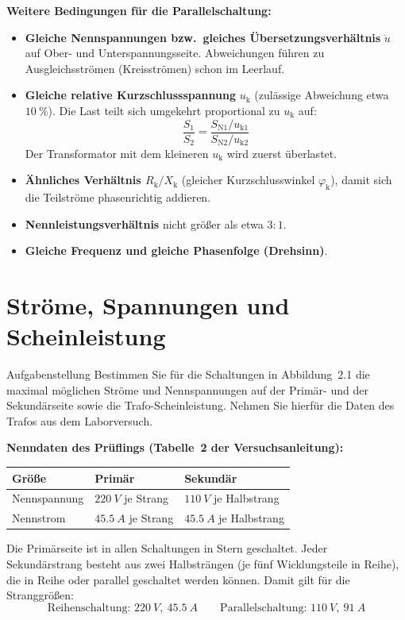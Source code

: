 \documentclass[a4paper,11pt]{scrreprt}
\newcommand{\ue}{\ddot{u}}
\begin{document}
\textbf{Weitere Bedingungen für die Parallelschaltung:}
\begin{itemize}[nosep]
  \item \textbf{Gleiche Nennspannungen bzw.\ gleiches Übersetzungsverhältnis} $\ue$ auf Ober- und Unterspannungsseite. Abweichungen führen zu Ausgleichsströmen (Kreisströmen) schon im Leerlauf.
  \item \textbf{Gleiche relative Kurzschlussspannung} $u_\mathrm{k}$ (zulässige Abweichung etwa $\SI{10}{\percent}$). Die Last teilt sich umgekehrt proportional zu $u_\mathrm{k}$ auf:
  \begin{equation*}
    \frac{S_1}{S_2} = \frac{S_\mathrm{N1}/u_\mathrm{k1}}{S_\mathrm{N2}/u_\mathrm{k2}}
  \end{equation*}
  Der Transformator mit dem kleineren $u_\mathrm{k}$ wird zuerst überlastet.
  \item \textbf{Ähnliches Verhältnis $R_\mathrm{k}/X_\mathrm{k}$} (gleicher Kurzschlusswinkel $\varphi_\mathrm{k}$), damit sich die Teilströme phasenrichtig addieren.
  \item \textbf{Nennleistungsverhältnis} nicht größer als etwa $3:1$.
  \item \textbf{Gleiche Frequenz und gleiche Phasenfolge (Drehsinn)}.
\end{itemize}

\section{Ströme, Spannungen und Scheinleistung}\label{sec:a2}

\begin{aufgabe}{Aufgabenstellung}
Bestimmen Sie für die Schaltungen in Abbildung~2.1 die maximal möglichen Ströme und Nennspannungen auf der Primär- und der Sekundärseite sowie die Trafo-Scheinleistung. Nehmen Sie hierfür die Daten des Trafos aus dem Laborversuch.
\end{aufgabe}

\textbf{Nenndaten des Prüflings (Tabelle~2 der Versuchsanleitung):}
\begin{center}
\begin{tabular}{@{}lll@{}}
\toprule
Größe & Primär & Sekundär\\
\midrule
Nennspannung & $\SI{220}{V}$ je Strang & $\SI{110}{V}$ je Halbstrang\\
Nennstrom & $\SI{45.5}{A}$ je Strang & $\SI{45.5}{A}$ je Halbstrang\\
\bottomrule
\end{tabular}
\end{center}
Die Primärseite ist in allen Schaltungen in Stern geschaltet. Jeder Sekundärstrang besteht aus zwei Halbsträngen (je fünf Wicklungsteile in Reihe), die in Reihe oder parallel geschaltet werden können. Damit gilt für die Stranggrößen:
\begin{equation*}
  \text{Reihenschaltung: } \SI{220}{V},\ \SI{45.5}{A}
  \qquad
  \text{Parallelschaltung: } \SI{110}{V},\ \SI{91}{A}
\end{equation*}
\end{document}
